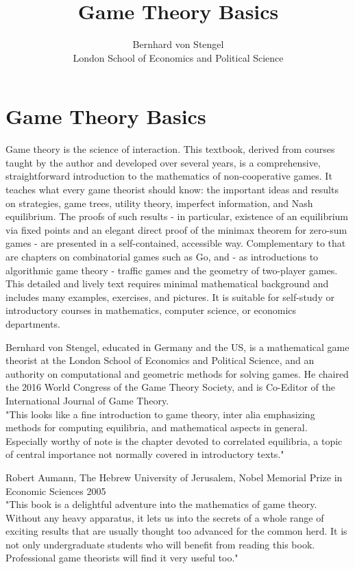 \documentclass[12pt]{article}
\title{Game Theory Basics }
\author{Bernhard von Stengel\\
London School of Economics and Political Science}
\date{}
\begin{document}
\maketitle
\captionsetup{singlelinecheck=false}
\section*{Game Theory Basics}
Game theory is the science of interaction. This textbook, derived from courses taught by the author and developed over several years, is a comprehensive, straightforward introduction to the mathematics of non-cooperative games. It teaches what every game theorist should know: the important ideas and results on strategies, game trees, utility theory, imperfect information, and Nash equilibrium. The proofs of such results - in particular, existence of an equilibrium via fixed points and an elegant direct proof of the minimax theorem for zero-sum games - are presented in a self-contained, accessible way. Complementary to that are chapters on combinatorial games such as Go, and - as introductions to algorithmic game theory - traffic games and the geometry of two-player games. This detailed and lively text requires minimal mathematical background and includes many examples, exercises, and pictures. It is suitable for self-study or introductory courses in mathematics, computer science, or economics departments.

Bernhard von Stengel, educated in Germany and the US, is a mathematical game theorist at the London School of Economics and Political Science, and an authority on computational and geometric methods for solving games. He chaired the 2016 World Congress of the Game Theory Society, and is Co-Editor of the International Journal of Game Theory.\\
"This looks like a fine introduction to game theory, inter alia emphasizing methods for computing equilibria, and mathematical aspects in general. Especially worthy of note is the chapter devoted to correlated equilibria, a topic of central importance not normally covered in introductory texts."

Robert Aumann, The Hebrew University of Jerusalem, Nobel Memorial Prize in Economic Sciences 2005\\
"This book is a delightful adventure into the mathematics of game theory. Without any heavy apparatus, it lets us into the secrets of a whole range of exciting results that are usually thought too advanced for the common herd. It is not only undergraduate students who will benefit from reading this book. Professional game theorists will find it very useful too."
\end{document}
